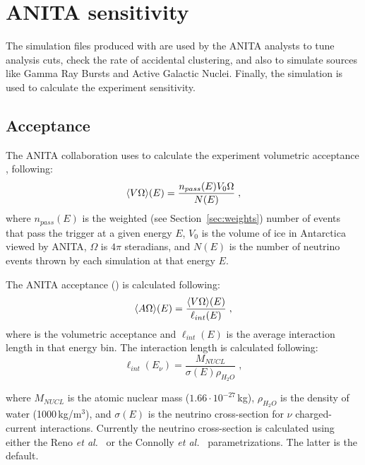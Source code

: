 \section{ANITA sensitivity}
\label{sec:results}

The simulation files produced with \icemc are used by the ANITA analysts to tune analysis cuts, check the rate of accidental clustering, and also to simulate sources like Gamma Ray Bursts and Active Galactic Nuclei.
Finally, the simulation is used to calculate the experiment sensitivity.

\subsection{Acceptance}
\label{subsec:acceptance}
The ANITA collaboration uses \icemc to calculate the experiment volumetric acceptance \effvol, following:
\begin{equation}
  \label{eq:volacceptance}
  \langle V\Omega\rangle(E) = \dfrac{n_{{pass}}(E)V_0\Omega}{N(E)} \;,
\end{equation}
\noindent where
 $n_{{pass}}(E)$ is the weighted (see Section~\ref{sec:weights}) number of events that pass the trigger at a given energy $E$,
 $V_0$ is the volume of ice in Antarctica viewed by ANITA,
$\Omega$ is $4\pi$ steradians, and 
 $N(E)$ is the number of neutrino events thrown by each simulation at that energy $E$.

The ANITA acceptance (\effarea) is calculated following:
\begin{equation}
  \label{eq:acceptance}
  \langle A\Omega\rangle(E) = \dfrac{\langle V\Omega\rangle(E)}{\ell_{{int}}(E)} \;,
\end{equation}
\noindent where
 \effvol is the volumetric acceptance and
 $\ell_{{int}}(E)$ is the average interaction length in that energy bin. %
The interaction length is calculated following:
 \begin{equation}
   \label{eq:intlength}
    \ell_{{int}}(E_\nu) =   \dfrac{M_{NUCL}}{\sigma(E) \rho_{H_2O} } \;,
  \end{equation}
  
\noindent where
 $M_{NUCL}$ is the atomic nuclear mass ($1.66\cdot 10^{-27}$\,kg),
 $\rho_{H_2O}$ is the density of water (1000\,kg/m$^3$), 
and $\sigma(E)$ is the neutrino cross-section for $\nu$ charged-current interactions.
Currently the neutrino cross-section is calculated using either the
Reno {\it et al.}~\cite{reno2005high}
or the Connolly {\it et al.}~\cite{PhysRevD.83.113009} parametrizations.
The latter is the default.

